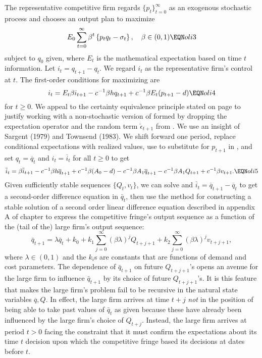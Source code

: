  The representative competitive firm regards $\{p_t\}_{t=0}^\infty$
as an exogenous  stochastic process and chooses
an output plan to
maximize
$$ E_0 \sum_{t=0}^\infty \beta^t \left\{
 p_t q_t - \sigma_t
 \right\}, \quad \beta \in(0,1) \EQN oli3 $$
subject to $q_0$ given, where  %
$E_t$ is the mathematical expectation based on time
$t$ information.
Let $i_t = q_{t+1} - q_t.$  We
regard $i_t$ as the representative firm's control at $t$.  The
first-order conditions
 for maximizing  are
$$  i_t =  E_t  \beta i_{t+1} -c^{-1} \beta h  q_{t+1}
  + c^{-1} \beta  E_t( p_{t+1} -d) \EQN oli4   $$
for $t \geq 0$.
We appeal to the  certainty equivalence principle stated on
page  to justify working with
a non-stochastic version of  formed by dropping
the expectation operator and the random term $\check \epsilon_{t+1}$
from .   We use
an insight  of Sargent (1979) and Townsend
(1983).
  We shift   forward one period, replace conditional
expectations with realized values,  use  to  substitute
for $p_{t+1}$ in  , and set $q_t = \overline q_t$  and $i_t = \overline i_t$ for all
$t\geq 0$ to get
$$ \overline i_t = \beta \overline  i_{t+1}  - c^{-1} \beta h \overline q_{t+1}
 + c^{-1} \beta (A_0-d) - c^{-1} \beta    A_1 \overline q_{t+1}
  -  c^{-1} \beta    A_1 Q_{t+1} + c^{-1} \beta    v_{t+1}. \EQN oli5 $$
Given sufficiently stable sequences $\{Q_t, v_t\}$, we can solve 
and $\overline i_t = \overline q_{t+1} - \overline q_t$ to get a second-order difference equation
in $\bar q_t$, then use the method  for constructing a stable solution
of a second order linear difference equation described  in appendix A of chapter   to
express the competitive fringe's
output sequence  as a function of the (tail of the)
large firm's output sequence:
$$ \bar q_{t+1} = \lambda \bar q_t +k_0 + k_1 \sum_{j=0}^\infty (\beta \lambda)^j Q_{t+j+1} + k_2 \sum_{j=0}^\infty (\beta \lambda)^j v_{t+j+1} , $$
where $\lambda \in (0,1)$ and the $k_i$s  are constants that are functions of demand and cost parameters.
The dependence of $\bar q_{t+1}$ on future $Q_{t+j+1}$'s opens an avenue for the large firm to influence $\bar q_{t+1}$ by its choice
of  future $Q_{t+j+1}$'s.
  It is this feature that makes the  large firm's problem fail  to be
recursive in the natural state variables $\overline q, Q$. In effect, the large firm arrives
at time $t+j$ {\it not\/} in the position of being able to take past values of $\bar q_t$ as given because these have already
been influenced by the large firm's choice of $Q_{t+j}$.  Instead, the large firm
arrives at period $t >0$  facing the  constraint that it must
 confirm the expectations about its time $t$ decision
upon which the competitive fringe   based its decisions at dates
before $t$.

